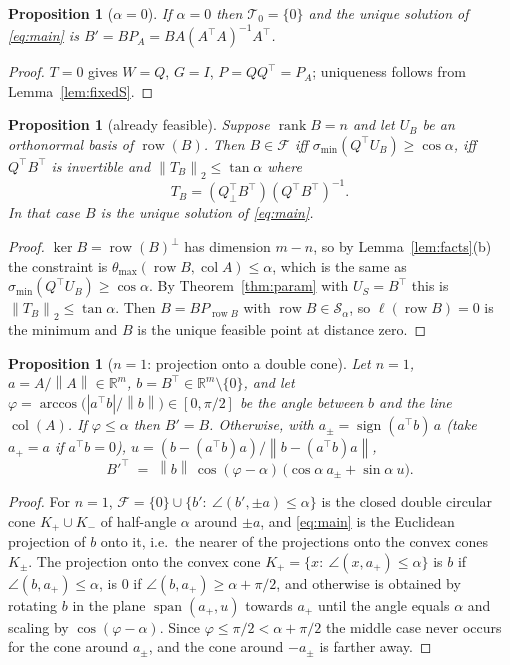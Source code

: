 \documentclass[11pt]{article}
\newtheorem{proposition}[theorem]{Proposition}
\theoremstyle{definition}
\newcommand{\R}{\mathbb{R}}
\newcommand{\col}{\operatorname{col}}
\newcommand{\row}{\operatorname{row}}
\newcommand{\rank}{\operatorname{rank}}
\newcommand{\norm}[1]{\left\lVert #1 \right\rVert}
\newcommand{\Qp}{Q_{\perp}}
\newcommand{\Tf}{\mathcal{T}}
\newcommand{\Sf}{\mathcal{S}}
\newcommand{\Ff}{\mathcal{F}}
\DeclareMathOperator{\sign}{sign}
\begin{document}
\begin{proposition}[$\alpha=0$]
If $\alpha=0$ then $\Tf_0=\{0\}$ and the unique solution of \eqref{eq:main} is $B'=BP_A=BA(A^\top A)^{-1}A^\top$.
\end{proposition}
\begin{proof}
$T=0$ gives $W=Q$, $G=I$, $P=QQ^\top=P_A$; uniqueness follows from Lemma~\ref{lem:fixedS}.
\end{proof}

\begin{proposition}[already feasible]\label{prop:feasible}
Suppose $\rank B=n$ and let $U_B$ be an orthonormal basis of $\row(B)$. Then $B\in\Ff$ iff $\sigma_{\min}(Q^\top U_B)\ge\cos\alpha$, iff $Q^\top B^\top$ is invertible and $\norm{T_B}_2\le\tan\alpha$ where
\begin{equation}\label{eq:TB}
 T_B=(\Qp^\top B^\top)(Q^\top B^\top)^{-1}.
\end{equation}
In that case $B$ is the unique solution of \eqref{eq:main}.
\end{proposition}
\begin{proof}
$\ker B=\row(B)^\perp$ has dimension $m-n$, so by Lemma~\ref{lem:facts}(b) the constraint is $\theta_{\max}(\row B,\col A)\le\alpha$, which is the same as $\sigma_{\min}(Q^\top U_B)\ge\cos\alpha$.
By Theorem~\ref{thm:param} with $U_S=B^\top$ this is $\norm{T_B}_2\le\tan\alpha$. Then $B=BP_{\row B}$ with $\row B\in\Sf_\alpha$, so $\ell(\row B)=0$ is the minimum and $B$ is the unique feasible point at distance zero.
\end{proof}

\begin{proposition}[$n=1$: projection onto a double cone]
Let $n=1$, $a=A/\norm A\in\R^m$, $b=B^\top\in\R^m\setminus\{0\}$, and let $\varphi=\arccos\big(|a^\top b|/\norm b\big)\in[0,\pi/2]$ be the angle between $b$ and the line $\col(A)$.
If $\varphi\le\alpha$ then $B'=B$. Otherwise, with $a_\pm=\sign(a^\top b)\,a$ (take $a_+=a$ if $a^\top b=0$), $u=(b-(a^\top b)a)/\norm{b-(a^\top b)a}$,
\begin{equation}
  B'^\top \;=\; \norm b\,\cos(\varphi-\alpha)\,\big(\cos\alpha\ a_\pm+\sin\alpha\ u\big).
\end{equation}
\end{proposition}
\begin{proof}
For $n=1$, $\Ff=\{0\}\cup\{b':\ \angle(b',\pm a)\le\alpha\}$ is the closed double circular cone $K_+\cup K_-$ of half-angle $\alpha$ around $\pm a$, and \eqref{eq:main} is the Euclidean projection of $b$ onto it, i.e.\ the nearer of the projections onto the convex cones $K_\pm$.
The projection onto the convex cone $K_+=\{x:\ \angle(x,a_+)\le\alpha\}$ is $b$ if $\angle(b,a_+)\le\alpha$, is $0$ if $\angle(b,a_+)\ge\alpha+\pi/2$, and otherwise is obtained by rotating $b$ in the plane $\operatorname{span}(a_+,u)$ towards $a_+$ until the angle equals $\alpha$ and scaling by $\cos(\varphi-\alpha)$. Since $\varphi\le\pi/2<\alpha+\pi/2$ the middle case never occurs for the cone around $a_\pm$, and the cone around $-a_\pm$ is farther away.
\end{proof}
\end{document}
